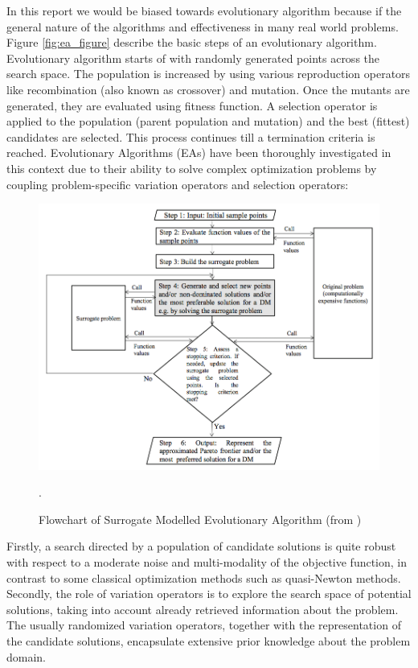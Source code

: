 \documentclass{newsig}
\begin{document}
 In this report we would be biased towards evolutionary algorithm because if the general nature of the algorithms and effectiveness in many real world problems. Figure \ref{fig:ea_figure} describe the basic steps of an evolutionary algorithm. Evolutionary algorithm starts of with randomly generated points across the search space. The population is increased by using various \textquotesingle reproduction \textquotesingle operators like recombination (also known as crossover) and mutation. Once the mutants are generated, they are evaluated using fitness function. A selection operator is applied to the population (parent population and mutation) and the best (fittest) candidates  are selected. This process continues till a termination criteria is reached.
 Evolutionary Algorithms (EAs) have been thoroughly investigated in this context due
to their ability to solve complex optimization problems by coupling problem-specific variation
operators and selection operators:

\begin{figure}[tbh]
\centering
\includegraphics[width=1.3\columnwidth]{Figures/SurrogateModels}
\caption{Flowchart of Surrogate Modelled Evolutionary Algorithm (from \cite{tabatabaei2015survey})}.
\label{fig:surrogate_models}
\end{figure}

Firstly, a search directed by a population of candidate solutions is quite robust with respect
to a moderate noise and multi-modality of the objective function, in contrast to
some classical optimization methods such as quasi-Newton methods.\\
Secondly, the role of variation operators is to explore the search space of potential solutions,
taking into account already retrieved information about the problem. The usually randomized variation operators, together with the representation of the candidate solutions,
encapsulate extensive prior knowledge about the problem domain.\\
\end{document}
